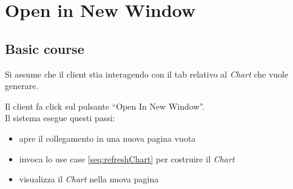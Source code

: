 \section{Open in New Window}
\label{seq:openInNewWindow}
\subsection{Basic course}
Si assume che il client stia interagendo con il tab relativo al \emph{Chart}
che vuole generare.

Il client fa click sul pulsante ``Open In New Window''.\\
Il sistema esegue questi passi:
\begin{itemize}
  \item apre il collegamento in una nuova pagina vuota
  \item invoca lo use case \ref{seq:refreshChart} per costruire il \emph{Chart}
  \item visualizza il \emph{Chart} nella nuova pagina
\end{itemize}